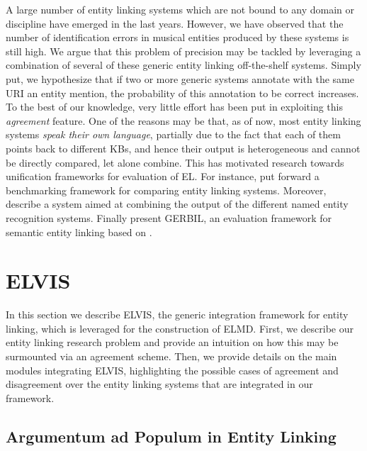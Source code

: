 A large number of entity linking systems which are not bound to any domain or discipline have emerged in the last years. However, we have observed that the number of identification errors in musical entities produced by these systems is still high. We argue that this problem of precision may be tackled by leveraging a combination of several of these generic entity linking off-the-shelf systems. Simply put, we hypothesize that if two or more generic systems annotate with the same URI an entity mention, the probability of this annotation to be correct increases. To the best of our knowledge, very little effort has been put in exploiting this \textit{agreement} feature. One of the reasons may be that, as of now, most entity linking systems \textit{speak their own language}, partially due to the fact that each of them points back to different KBs, and hence their output is heterogeneous and cannot be directly compared, let alone combine. This has motivated research towards unification frameworks for evaluation of EL. For instance, \cite{Cornolti2013} put forward a benchmarking framework for comparing entity linking systems. Moreover, \cite{Rizzo2014} describe a system aimed at combining the output of the different named entity recognition systems. Finally \cite{Usbeck2015} present \textsc{GERBIL}, an evaluation framework for semantic entity linking based on \cite{Cornolti2013}. %



\section{ELVIS}
\label{sec:linking:elvis}

In this section we describe \textsc{ELVIS}, the generic integration framework for entity linking, which is leveraged for the construction of \textsc{ELMD}. First, we describe our entity linking research problem and provide an intuition on how this may be surmounted via an agreement scheme. Then, we provide details on the main modules integrating \textsc{ELVIS}, highlighting the possible cases of agreement and disagreement over the entity linking systems that are integrated in our framework.

\subsection{Argumentum ad Populum in Entity Linking}
\label{sec:linking:agreement}

